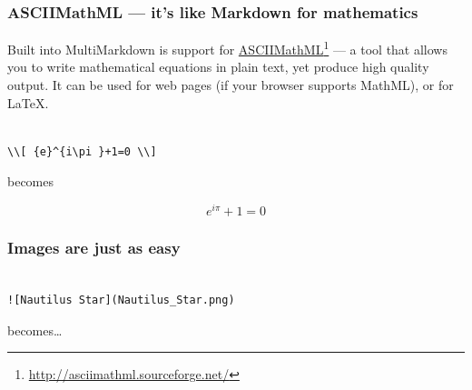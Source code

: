 \begin{frame}[fragile]

\frametitle{ASCIIMathML --- it's like Markdown for mathematics}
\label{asciimathml---itslikemarkdownformathematics}

Built into MultiMarkdown is support for
\href{http://asciimathml.sourceforge.net/}{ASCIIMathML}\footnote{\href{http://asciimathml.sourceforge.net/}{http:\slash \slash asciimathml.sourceforge.net\slash }} --- a tool that allows you
to write mathematical equations in plain text, yet produce high quality
output. It can be used for web pages (if your browser supports MathML), or for
LaTeX.

\begin{verbatim}

\\[ {e}^{i\pi }+1=0 \\]

\end{verbatim}


becomes

\[ {e}^{i\pi }+1=0 \]

\end{frame}

\begin{frame}[fragile]

\frametitle{Images are just as easy}
\label{imagesarejustaseasy}

\begin{verbatim}

![Nautilus Star](Nautilus_Star.png)

\end{verbatim}


becomes{\ldots}

\end{frame}


